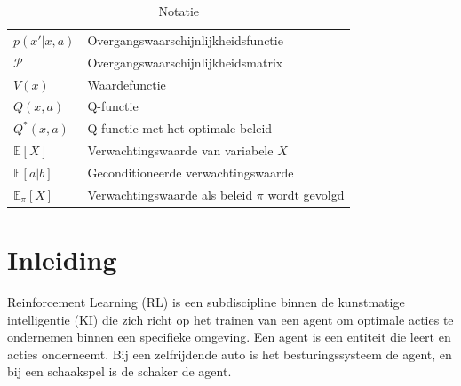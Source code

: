 \documentclass[a4paper,12pt]{report}
\begin{document}
\begin{table}[h]
\begin{tabular}{>{\raggedright}p{2.5cm} >{\raggedright\arraybackslash}p{10cm}}
        $p(x'|x, a)$             & Overgangswaarschijnlijkheidsfunctie               \\
        $\mathcal{P}$            & Overgangswaarschijnlijkheidsmatrix                \\
        $V(x)$                   & Waardefunctie                                     \\
        $Q(x, a)$                & Q-functie                                         \\
        $Q^*(x, a)$              & Q-functie met het optimale beleid                 \\
        $\mathbb{E}[X]$          & Verwachtingswaarde van variabele $X$              \\
        $\mathbb{E}[a|b]$        & Geconditioneerde verwachtingswaarde               \\
        $\mathbb{E}_{\pi}[X]$    & Verwachtingswaarde als beleid $\pi$ wordt gevolgd \\
    \end{tabular}
    \caption{Notatie}
\end{table}

\newpage

\tableofcontents
\newpage
{}  %

\chapter{Inleiding}
Reinforcement Learning (RL) is een subdiscipline binnen de kunstmatige
intelligentie (KI) die zich richt op het trainen van een agent om optimale
acties te ondernemen binnen een specifieke omgeving. Een agent is een entiteit
die leert en acties onderneemt. Bij een zelfrijdende auto is het
besturingssysteem de agent, en bij een schaakspel is de schaker de agent.
\end{document}
